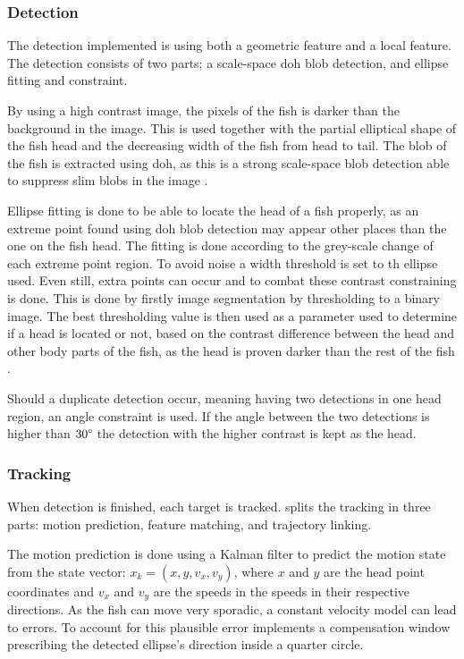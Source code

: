 \subsubsection{Detection}
The detection implemented is using both a geometric feature and a local feature. The detection consists of two parts; a scale-space \gls{doh} blob detection, and ellipse fitting and constraint.

By using a high contrast image, the pixels of the fish is darker than the background in the image. This is used together with the partial elliptical shape of the fish head and the decreasing width of the fish from head to tail. The blob of the fish is extracted using \gls{doh}, as this is a strong scale-space blob detection able to suppress slim blobs in the image \citep{Qian2014}.

Ellipse fitting is done to be able to locate the head of a fish properly, as an extreme point found using \gls{doh} blob detection may appear other places than the one on the fish head. The fitting is done according to the grey-scale change of each extreme point region. To avoid noise a width threshold is set to th ellipse used. Even still, extra points can occur and to combat these contrast constraining is done. This is done by firstly image segmentation by thresholding to a binary image. The best thresholding value is then used as a parameter used to determine if a head is located or not, based on the contrast difference between the head and other body parts of the fish, as the head is proven darker than the rest of the fish \citep{Qian2014}.

Should a duplicate detection occur, meaning having two detections in one head region, an angle constraint is used. If the angle between the two detections is higher than $30 \degree$ the detection with the higher contrast is kept as the head.

\subsubsection{Tracking}
When detection is finished, each target is tracked. \cite{Qian2014} splits the tracking in three parts: motion prediction, feature matching, and trajectory linking.

The motion prediction is done using a Kalman filter to predict the motion state from the state vector: $ x_k = (x,y,v_x,v_y) $, where $x$ and $y$ are the head point coordinates and $v_x$ and $ v_y $ are the speeds in the speeds in their respective directions. As the fish can move very sporadic, a constant velocity model can lead to errors. To account for this plausible error \cite{Qian2014} implements a compensation window prescribing the detected ellipse's direction inside a quarter circle.

